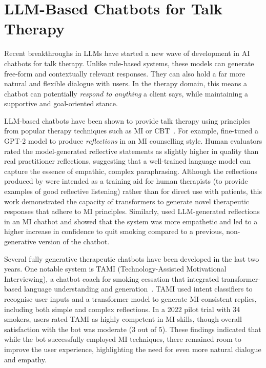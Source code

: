 \section{LLM-Based Chatbots for Talk Therapy}
Recent breakthroughs in LLMs have started a new wave of development in AI chatbots for talk therapy. Unlike rule-based systems, these models can generate free-form and contextually relevant responses. They can also hold a far more natural and flexible dialogue with users. In the therapy domain, this means a chatbot can potentially \textit{respond to anything} a client says, while maintaining a supportive and goal-oriented stance.

LLM-based chatbots have been shown to provide talk therapy using principles from popular therapy techniques such as MI or CBT~\cite{mahmood-etal-2025-fully,kian2024can,Ye2025}. For example, \citet{shen-etal-2020-counseling} fine-tuned a GPT-2 model to produce \emph{reflections} in an MI counselling style. Human evaluators rated the model-generated reflective statements as slightly higher in quality than real practitioner reflections, suggesting that a well-trained language model can capture the essence of empathic, complex paraphrasing. Although the reflections produced by \citet{shen-etal-2020-counseling} were intended as a training aid for human therapists (to provide examples of good reflective listening) rather than for direct use with patients, this work demonstrated the capacity of transformers to generate novel therapeutic responses that adhere to MI principles. Similarly, \citet{brown2023mi} used LLM-generated reflections in an MI chatbot and showed that the system was more empathetic and led to a higher increase in confidence to quit smoking compared to a previous, non-generative version of the chatbot.


Several fully generative therapeutic chatbots have been developed in the last two years. One notable system is TAMI (Technology-Assisted Motivational Interviewing), a chatbot coach for smoking cessation that integrated transformer-based language understanding and generation~\cite{SAIYED2022121}. TAMI used intent classifiers to recognise user inputs and a transformer model to generate MI-consistent replies, including both simple and complex reflections. In a 2022 pilot trial with 34 smokers, users rated TAMI as highly competent in MI skills, though overall satisfaction with the bot was moderate (3 out of 5). These findings indicated that while the bot successfully employed MI techniques, there remained room to improve the user experience, highlighting the need for even more natural dialogue and empathy.


